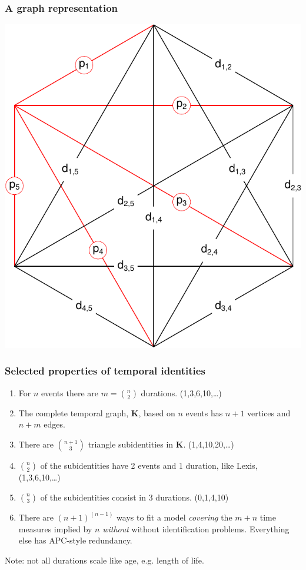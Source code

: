 \documentclass[20pt]{beamer}
\begin{document}
\begin{frame}
\frametitle{A graph representation}
\centering
\includegraphics[scale=1.1]{Figures/edgep5.pdf}\\
\end{frame}

\begin{frame}
\frametitle{Selected properties of temporal identities}
\begin{enumerate}[<+->]
  \item For $n$ events there are $m = \binom{n}{2}$ durations. (1,3,6,10,\ldots)
  \item The complete temporal graph, $\textbf{K}$, based on $n$ events has $n+1$
  vertices and $n+m$ edges.
  \item There are $\binom{n+1}{3}$ triangle subidentities in $\textbf{K}$.
  (1,4,10,20,\ldots)
  \item $\binom{n}{2}$ of the subidentities have 2 events and 1 duration,
  like Lexis,  (1,3,6,10,\ldots)
  \item $\binom{n}{3}$ of the subidentities consist in 3 durations. (0,1,4,10)
  \item There are $(n+1)^{(n-1)}$ ways to fit a model \emph{covering} the $m+n$
  time measures implied by $n$ \emph{without} without identification
  problems. Everything else has APC-style redundancy.
\end{enumerate}
\small
Note: not all durations scale like age, e.g. length of life. 
\end{frame}
\end{document}
